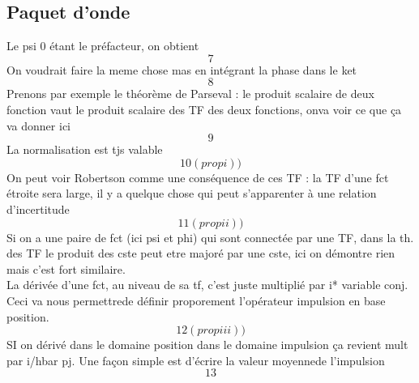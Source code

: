 \subsection{Paquet d'onde}
Le psi 0 étant le préfacteur, on obtient
\begin{equation}
7
\end{equation}
On voudrait faire la meme chose mas en intégrant la phase dans le ket
\begin{equation}
8
\end{equation}
Prenons par exemple le théorème de Parseval : le produit scalaire de deux fonction vaut le 
produit scalaire des TF des deux fonctions, onva voir ce que ça va donner ici
\begin{equation}
9
\end{equation}
La normalisation est tjs valable
\begin{equation}
10 (prop i) )
\end{equation}
On peut voir Robertson comme une conséquence de ces TF : la TF d'une fct étroite sera large, il y 
a quelque chose qui peut s'apparenter à une relation d'incertitude
\begin{equation}
11 (prop ii) )
\end{equation}
Si on a une paire de fct (ici psi et phi) qui sont connectée par une TF, dans la th. des TF le 
produit des cste peut etre majoré par une cste, ici on démontre rien mais c'est fort similaire.\\

La dérivée d'une fct, au niveau de sa tf, c'est juste multiplié par i* variable conj. Ceci va 
nous permettrede définir proporement l'opérateur impulsion en base position.
\begin{equation}
12 (prop iii) )
\end{equation}
SI on dérivé dans le domaine position dans le domaine impulsion ça revient  mult par i/hbar pj. Une 
façon simple est d'écrire la valeur moyennede l'impulsion
\begin{equation}
13
\end{equation}